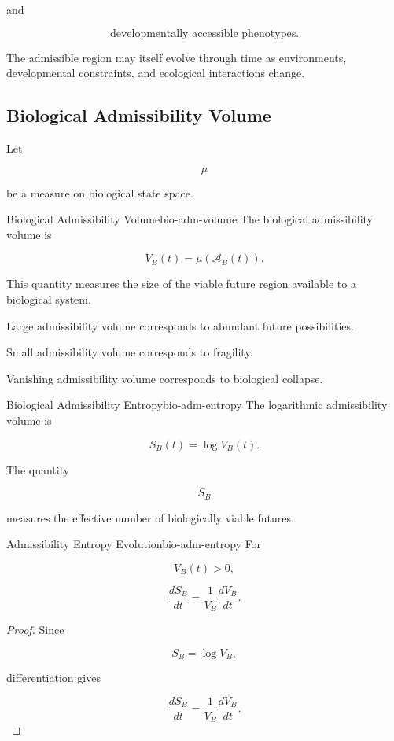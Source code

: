 \documentclass[12pt,twoside,openright]{book}
\begin{document}
and

\[
\text{developmentally accessible phenotypes}.
\]

The admissible region may itself evolve through time as
environments, developmental constraints, and ecological
interactions change.

\subsection{Biological Admissibility Volume}

Let

\[
\mu
\]

be a measure on biological state space.

\begin{definition}{Biological Admissibility Volume}{bio-adm-volume}
The biological admissibility volume is

\[
V_B(t)
=
\mu(\mathcal A_B(t)).
\]
\end{definition}

This quantity measures the size of the viable future
region available to a biological system.

Large admissibility volume corresponds to abundant future
possibilities.

Small admissibility volume corresponds to fragility.

Vanishing admissibility volume corresponds to biological
collapse.

\begin{definition}{Biological Admissibility Entropy}{bio-adm-entropy}
The logarithmic admissibility volume is

\[
S_B(t)
=
\log V_B(t).
\]
\end{definition}

The quantity

\[
S_B
\]

measures the effective number of biologically viable
futures.

\begin{proposition}{Admissibility Entropy Evolution}{bio-adm-entropy}
For

\[
V_B(t)>0,
\]

\[
\frac{dS_B}{dt}
=
\frac{1}{V_B}
\frac{dV_B}{dt}.
\]
\end{proposition}

\begin{proof}
Since

\[
S_B
=
\log V_B,
\]

differentiation gives

\[
\frac{dS_B}{dt}
=
\frac{1}{V_B}
\frac{dV_B}{dt}.
\]
\end{proof}
\end{document}
